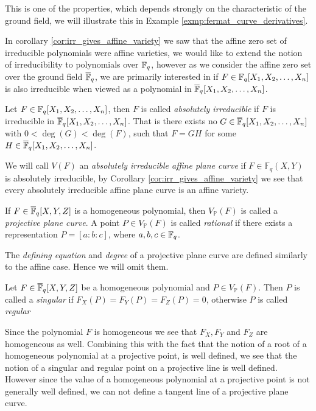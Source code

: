 This is one of the properties, which depends strongly on the characteristic of the ground field, we will illustrate this in Example \ref{exmp:fermat_curve_derivatives}.

In corollary \ref{cor:irr_gives_affine_variety} we saw that the affine zero set of irreducible polynomials were affine varieties, we would like to extend the notion of irreducibility to polynomials over $\mathbb{F}_{q}$, however as we consider the affine zero set over the ground field $\overline{\mathbb{F}}_{q}$, we are primarily interested in if $F \in \mathbb{F}_{q}[X_1, X_2, \ldots, X_{n}]$ is also irreducible when viewed as a polynomial in $\overline{\mathbb{F}}_{q}[X_1, X_2, \ldots, X_{n}]$.
\begin{definition}
  Let $F \in \mathbb{F}_{q}[X_1, X_2, \ldots, X_{n}]$, then $F$ is called \textit{absolutely irreducible} if $F$ is irreducible in $\overline{\mathbb{F}}_{q}[X_1, X_2, \ldots, X_{n}]$. That is there exists no $G \in \overline{\mathbb{F}}_{q}[X_1, X_2, \ldots, X_{n}]$ with $0 < \deg(G) < \deg(F)$, such that $F = G H$ for some $H \in \overline{\mathbb{F}}_{q}[X_1, X_2, \ldots, X_{n}]$.
\end{definition}

We will call $V(F)$ an \textit{absolutely irreducible affine plane curve} if $F \in \mathbb{F}_{q}(X, Y)$ is absolutely irreducible, by Corollary \ref{cor:irr_gives_affine_variety} we see that every absolutely irreducible affine plane curve is an affine variety.


\begin{definition}
  If $F \in \overline{\mathbb{F}}_{q}[X, Y, Z]$ is a homogeneous polynomial, then $V_{\mathbb{P}}(F)$ is called a \textit{projective plane curve}. A point $P \in V_{\mathbb{P}}(F)$ is called \textit{rational} if there exists a representation $P = [a : b : c]$, where $a, b, c \in \mathbb{F}_{q}$.
\end{definition}
The \textit{defining equation} and \textit{degree} of a projective plane curve are defined similarly to the affine case. Hence we will omit them.
\begin{definition}
  Let $F \in \overline{\mathbb{F}}_{q}[X, Y, Z]$ be a homogeneous polynomial and $P \in V_{\mathbb{P}}(F)$. Then $P$ is called a \textit{singular} if $F_{X}(P) = F_{Y}(P) = F_{Z}(P) = 0$, otherwise $P$ is called \textit{regular}
\end{definition}
\begin{remark}
  Since the polynomial $F$ is homogeneous we see that $F_X, F_Y$ and $F_Z$ are homogeneous as well.
  Combining this with the fact that the notion of a root of a homogeneous polynomial at a projective point, is well defined, we see that the notion of a singular and regular point on a projective line is well defined. \\
  However since the value of a homogeneous polynomial at a projective point is not generally well defined, we can not define a tangent line of a projective plane curve.
\end{remark}


